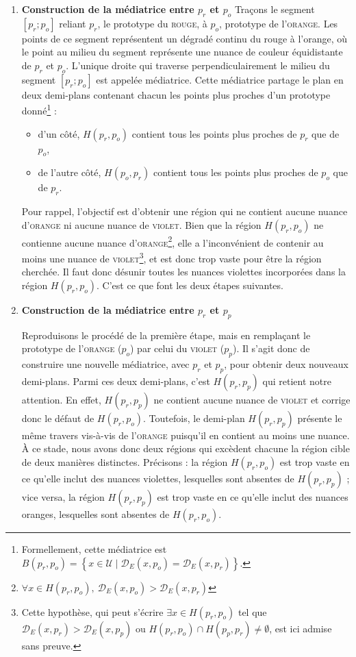 \documentclass{article}
\begin{document}
\begin{enumerate}[label=\textbf{(\roman*)}]
  \item \textbf{Construction de la médiatrice entre $p_r$ et $p_o$}
  Traçons le segment $[p_r; p_o]$ reliant $p_r$, le prototype du \textsc{rouge}, à $p_o$, prototype de l’\textsc{orange}. Les points de ce segment représentent un dégradé continu du rouge à l'orange, où le point au milieu du segment représente une nuance de couleur équidistante de $p_r$ et $p_o$. L’unique droite qui traverse perpendiculairement le milieu du segment $[p_r; p_o]$ est appelée médiatrice. Cette médiatrice partage le plan en deux demi-plans contenant chacun les points plus proches d’un prototype donné\footnote{Formellement, cette médiatrice est $B(p_r,p_o)=\left\{x\in\mathcal{U} \mid \mathcal{D}_E(x,p_o)=\mathcal{D}_E(x,p_r)\right\}$.} :
\begin{itemize}
    \item d'un côté, $H(p_r,p_o)$ contient tous les points plus proches de $p_r$ que de $p_o$,
    \item de l'autre côté, $H(p_o,p_r)$ contient tous les points plus proches de $p_o$ que de $p_r$.
\end{itemize}
Pour rappel, l’objectif est d’obtenir une région qui ne contient aucune nuance d’\textsc{orange} ni aucune nuance de \textsc{violet}. Bien que la région $H(p_r,p_o)$ ne contienne aucune nuance d’\textsc{orange}\footnote{$\forall x\in H(p_r,p_o),\ \mathcal{D}_E(x,p_o)>\mathcal{D}_E(x,p_r)$}, elle a l’inconvénient de contenir au moins une nuance de \textsc{violet}\footnote{Cette hypothèse, qui peut s’écrire $\exists x\in H(p_r,p_o)$ tel que $\mathcal{D}_E(x,p_r)>\mathcal{D}_E(x,p_p)$ ou $H(p_r,p_o)\cap H(p_p,p_r)\neq\emptyset$, est ici admise sans preuve.}, et est donc trop vaste pour être la région cherchée. Il faut donc désunir toutes les nuances violettes incorporées dans la région $H(p_r,p_o)$. C'est ce que font les deux étapes suivantes.


  \item \textbf{Construction de la médiatrice entre $p_r$ et $p_p$}

Reproduisons le procédé de la première étape, mais en remplaçant le prototype de l’\textsc{orange} ($p_o$) par celui du \textsc{violet} ($p_p$). Il s’agit donc de construire une nouvelle médiatrice, avec $p_r$ et $p_p$, pour obtenir deux nouveaux demi-plans. Parmi ces deux demi-plans, c’est $H(p_r,p_p)$ qui retient notre attention. En effet, $H(p_r,p_p)$ ne contient aucune nuance de \textsc{violet} et corrige donc le défaut de $H(p_r,p_o)$. Toutefois, le demi-plan $H(p_r,p_p)$ présente le même travers vis-à-vis de l'\textsc{orange} puisqu’il en contient au moins une nuance. À ce stade, nous avons donc deux régions qui excèdent chacune la région cible de deux manières distinctes. Précisons : la région $H(p_r,p_o)$ est trop vaste en ce qu’elle inclut des nuances violettes, lesquelles sont absentes de $H(p_r,p_p)$ ; vice versa, la région $H(p_r,p_p)$ est trop vaste en ce qu’elle inclut des nuances oranges, lesquelles sont absentes de $H(p_r,p_o)$.


\end{enumerate}
\end{document}
